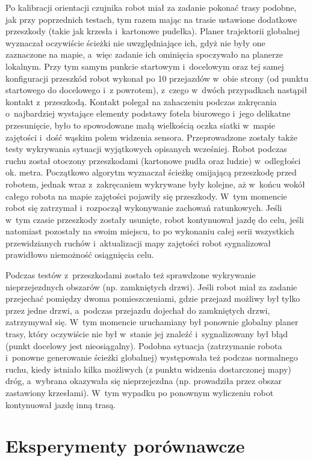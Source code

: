 Po kalibracji orientacji czujnika robot miał za zadanie pokonać trasy podobne,
jak przy poprzednich testach, tym razem mając na trasie ustawione dodatkowe
przeszkody (takie jak krzesła i~kartonowe pudełka). Planer trajektorii
globalnej wyznaczał oczywiście ścieżki nie uwzględniające ich, gdyż nie
były one zaznaczone na mapie, a~więc zadanie ich ominięcia spoczywało na
planerze lokalnym. Przy tym samym punkcie startowym i~docelowym oraz tej
samej konfiguracji przeszkód robot wykonał po 10 przejazdów w~obie strony
(od punktu startowego do docelowego i~z powrotem), z~czego w~dwóch przypadkach
nastąpił kontakt z~przeszkodą. Kontakt polegał na zahaczeniu podczas zakręcania
o~najbardziej wystające elementy podstawy fotela biurowego i~jego delikatne
przesunięcie, było to spowodowane małą wielkością oczka siatki w~mapie zajętości
i~dość wąskim polem widzenia sensora. Przeprowadzone zostały także testy
wykrywania sytuacji wyjątkowych opisanych wcześniej. Robot podczas ruchu
został otoczony przeszkodami (kartonowe pudła oraz ludzie) w~odległości
ok. metra. Początkowo algorytm wyznaczał ścieżkę omijającą przeszkodę przed
robotem, jednak wraz z~zakręcaniem wykrywane były kolejne, aż w~końcu wokół
całego robota na mapie zajętości pojawiły się przeszkody. W~tym momencie
robot się zatrzymał i~rozpoczął wykonywanie zachowań ratunkowych. Jeśli
w~tym czasie przeszkody zostały usunięte, robot kontynuował jazdę do celu,
jeśli natomiast pozostały na swoim miejscu, to po wykonaniu całej serii
wszystkich przewidzianych ruchów i~aktualizacji mapy zajętości robot sygnalizował
prawidłowo niemożność osiągnięcia celu.

Podczas testów z~przeszkodami zostało też sprawdzone wykrywanie nieprzejezdnych
obszarów (np. zamkniętych drzwi). Jeśli robot miał za zadanie przejechać pomiędzy
dwoma pomieszczeniami, gdzie przejazd możliwy był tylko przez jedne drzwi,
a~podczas przejazdu dojechał do zamkniętych drzwi, zatrzymywał się. W~tym
momencie uruchamiany był ponownie globalny planer trasy, który oczywiście
nie był w~stanie jej znaleźć i~sygnalizowany był błąd (punkt docelowy jest
nieosiągalny). Podobna sytuacja (zatrzymanie robota i~ponowne generowanie
ścieżki globalnej) występowała też podczas normalnego ruchu, kiedy istniało
kilka możliwych (z punktu widzenia dostarczonej mapy) dróg, a~wybrana okazywała
się nieprzejezdna (np. prowadziła przez obszar zastawiony krzesłami). W~tym
wypadku po ponownym wyliczeniu robot kontynuował jazdę inną trasą.

\section{Eksperymenty porównawcze}

